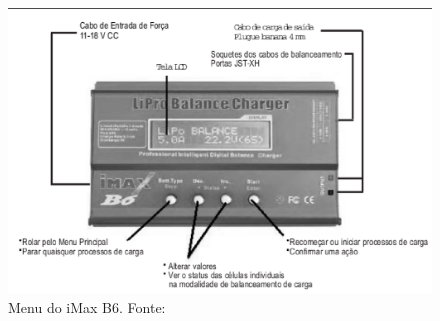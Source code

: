  \begin{figure}[H]
    \centering
	\includegraphics[keepaspectratio=true,scale=0.5]{figuras/manual.eps}
    \caption{Menu do iMax B6. Fonte: \cite{ibmax}}
\end{figure}
